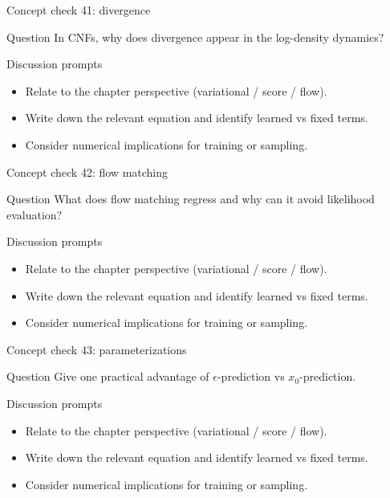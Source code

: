 \documentclass[aspectratio=169]{beamer}
\begin{document}
\begin{frame}{Concept check 41: divergence}
\begin{block}{Question}
In CNFs, why does divergence appear in the log-density dynamics?
\end{block}
\begin{block}{Discussion prompts}
\begin{itemize}
\item Relate to the chapter perspective (variational / score / flow).
\item Write down the relevant equation and identify learned vs fixed terms.
\item Consider numerical implications for training or sampling.
\end{itemize}
\end{block}
\end{frame}

\begin{frame}{Concept check 42: flow matching}
\begin{block}{Question}
What does flow matching regress and why can it avoid likelihood evaluation?
\end{block}
\begin{block}{Discussion prompts}
\begin{itemize}
\item Relate to the chapter perspective (variational / score / flow).
\item Write down the relevant equation and identify learned vs fixed terms.
\item Consider numerical implications for training or sampling.
\end{itemize}
\end{block}
\end{frame}

\begin{frame}{Concept check 43: parameterizations}
\begin{block}{Question}
Give one practical advantage of \(\epsilon\)-prediction vs \(x_0\)-prediction.
\end{block}
\begin{block}{Discussion prompts}
\begin{itemize}
\item Relate to the chapter perspective (variational / score / flow).
\item Write down the relevant equation and identify learned vs fixed terms.
\item Consider numerical implications for training or sampling.
\end{itemize}
\end{block}
\end{frame}
\end{document}
